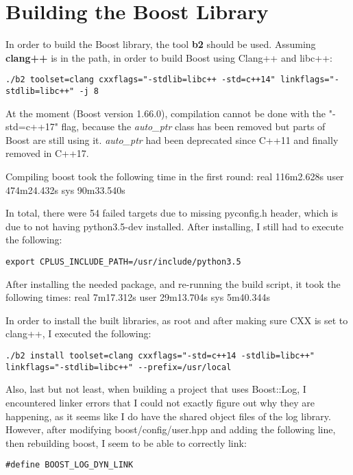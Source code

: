 \chapter{Building the Boost Library}

In order to build the Boost library, the tool \textbf{b2} should be used. Assuming \textbf{clang++} is in the path, in order to build Boost using Clang++ and libc++:

\begin{lstlisting}
./b2 toolset=clang cxxflags="-stdlib=libc++ -std=c++14" linkflags="-stdlib=libc++" -j 8
\end{lstlisting}

At the moment (Boost version 1.66.0), compilation cannot be done with the "-std=c++17" flag, because the \textit{auto_ptr} class has been removed but parts of Boost are still using it. \textit{auto_ptr} had been deprecated since C++11 and finally removed in C++17.

Compiling boost took the following time in the first round:
real	116m2.628s
user	474m24.432s
sys	90m33.540s

In total, there were 54 failed targets due to missing pyconfig.h header, which is due to not having python3.5-dev installed. After installing, I still had to execute the following:
\begin{lstlisting}
export CPLUS_INCLUDE_PATH=/usr/include/python3.5
\end{lstlisting}

After installing the needed package, and re-running the build script, it took the following times:
real	7m17.312s
user	29m13.704s
sys	5m40.344s

In order to install the built libraries, as root and after making sure CXX is set to clang++, I executed the following:
\begin{lstlisting}
./b2 install toolset=clang cxxflags="-std=c++14 -stdlib=libc++" linkflags="-stdlib=libc++" --prefix=/usr/local
\end{lstlisting}

Also, last but not least, when building a project that uses Boost::Log, I encountered linker errors that I could not exactly figure out why they are happening, as it seems like I do have the shared object files of the log library. However, after modifying boost/config/user.hpp and adding the following line, then rebuilding boost, I seem to be able to correctly link:
\begin{lstlisting}
#define BOOST_LOG_DYN_LINK
\end{lstlisting}

